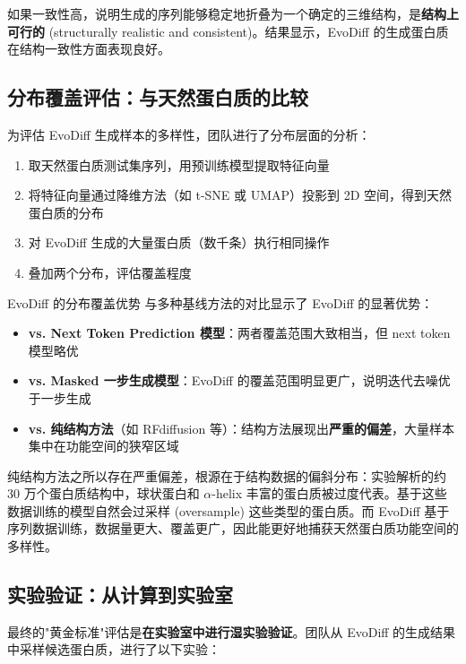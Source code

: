 \documentclass[a4paper]{article}
\begin{document}
如果一致性高，说明生成的序列能够稳定地折叠为一个确定的三维结构，是\textbf{结构上可行的} (structurally realistic and consistent)。结果显示，EvoDiff 的生成蛋白质在结构一致性方面表现良好。

\subsection{分布覆盖评估：与天然蛋白质的比较}

为评估 EvoDiff 生成样本的多样性，团队进行了分布层面的分析：

\begin{enumerate}
    \item 取天然蛋白质测试集序列，用预训练模型提取特征向量
    \item 将特征向量通过降维方法（如 t-SNE 或 UMAP）投影到 2D 空间，得到天然蛋白质的分布
    \item 对 EvoDiff 生成的大量蛋白质（数千条）执行相同操作
    \item 叠加两个分布，评估覆盖程度
\end{enumerate}

\begin{importantbox}{EvoDiff 的分布覆盖优势}
与多种基线方法的对比显示了 EvoDiff 的显著优势：
\begin{itemize}
    \item \textbf{vs. Next Token Prediction 模型}：两者覆盖范围大致相当，但 next token 模型略优
    \item \textbf{vs. Masked 一步生成模型}：EvoDiff 的覆盖范围明显更广，说明迭代去噪优于一步生成
    \item \textbf{vs. 纯结构方法}（如 RFdiffusion 等）：结构方法展现出\textbf{严重的偏差}，大量样本集中在功能空间的狭窄区域
\end{itemize}
\end{importantbox}

纯结构方法之所以存在严重偏差，根源在于结构数据的偏斜分布：实验解析的约 30 万个蛋白质结构中，球状蛋白和 $\alpha$-helix 丰富的蛋白质被过度代表。基于这些数据训练的模型自然会过采样 (oversample) 这些类型的蛋白质。而 EvoDiff 基于序列数据训练，数据量更大、覆盖更广，因此能更好地捕获天然蛋白质功能空间的多样性。

\subsection{实验验证：从计算到实验室}

最终的"黄金标准"评估是\textbf{在实验室中进行湿实验验证}。团队从 EvoDiff 的生成结果中采样候选蛋白质，进行了以下实验：
\end{document}
